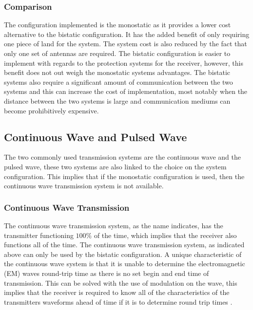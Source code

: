 \documentclass[11pt]{witseiepaper}
\begin{document}
\subsubsection{Comparison} \label{sec:Comparison}

The configuration implemented is the monostatic as it provides a lower cost alternative to the bistatic configuration. It has the added benefit of only requiring one piece of land for the system. The system cost is also reduced by the fact that only one set of antennas are required.
The bistatic configuration is easier to implement with regards to the protection systems for the receiver, however, this benefit does not out weigh the monostatic systems advantages. The bistatic systems also require a significant amount of communication between the two systems and this can increase the cost of implementation, most notably when the distance between the two systems is large and communication mediums can become prohibitively expensive.

\subsection{Continuous Wave and Pulsed Wave} \label{sec:ContinuousWaveandPulsedWave}

The two commonly used transmission systems are the continuous wave and the pulsed wave, these two systems are also linked to the choice on the system configuration.
This implies that if the monostatic configuration is used, then the continuous wave transmission system is not available.

\subsubsection{Continuous Wave Transmission} \label{sec:ContinuousWaveTransmission}

The continuous wave transmission system, as the name indicates, has the transmitter functioning $100\%$ of the time, which implies that the receiver also functions all of the time. The continuous wave transmission system, as indicated above can only be used by the bistatic configuration. 
A unique characteristic of the continuous wave system is that it is unable to determine the electromagnetic (EM) waves round-trip time as there is no set begin and end time of transmission. This can be solved with the use of modulation on the wave, this implies that the receiver is required to know all of the characteristics of the transmitters waveforms ahead of time if it is to determine round trip times \cite[p.~20]{radarHandbook}.
\end{document}
